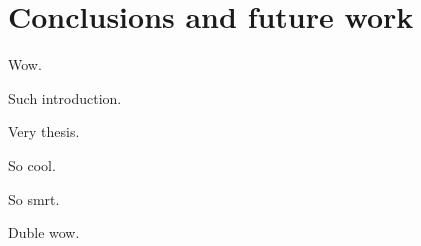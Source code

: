 
\chapter{Conclusions and future work}
\label{ch:conclusions}

Wow.

Such introduction.

Very thesis.

So cool.

So smrt.

Duble wow.
